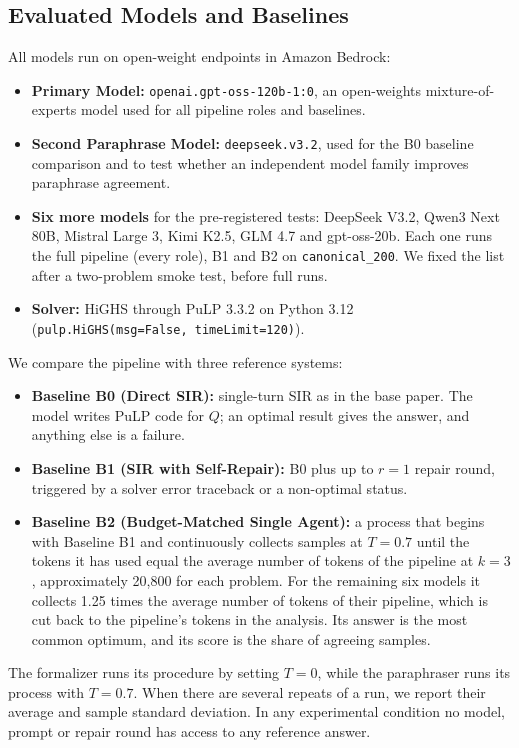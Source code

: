 \documentclass[conference]{IEEEtran}
\begin{document}
\subsection{Evaluated Models and Baselines}
All models run on open-weight endpoints in Amazon Bedrock:
\begin{itemize}
\item \textbf{Primary Model:} \texttt{openai.gpt-oss-120b-1:0}, an open-weights mixture-of-experts model used for all pipeline roles and baselines.
\item \textbf{Second Paraphrase Model:} \texttt{deepseek.v3.2}, used for the B0 baseline comparison and to test whether an independent model family improves paraphrase agreement.
\item \textbf{Six more models} for the pre-registered tests: DeepSeek V3.2, Qwen3 Next 80B, Mistral Large 3, Kimi
K2.5, GLM 4.7 and gpt-oss-20b. Each one runs the full pipeline (every role), B1 and B2 on \texttt{canonical\_200}.
We fixed the list after a two-problem smoke test, before full runs.
\item \textbf{Solver:} HiGHS through PuLP 3.3.2 on Python 3.12 (\texttt{pulp.HiGHS(msg=False, timeLimit=120)}).
\end{itemize}

We compare the pipeline with three reference systems:
\begin{itemize}
\item \textbf{Baseline B0 (Direct SIR):} single-turn SIR as in the base paper. The model writes PuLP code for $Q$; an optimal result gives the answer, and anything else is a failure.
\item \textbf{Baseline B1 (SIR with Self-Repair):} B0 plus up to $r = 1$ repair round, triggered by a solver error traceback or a non-optimal status.
\item \textbf{Baseline B2 (Budget-Matched Single Agent):} a process that begins with Baseline B1 and continuously collects samples at $T = 0.7$ until the tokens it has used equal the average number of tokens of the pipeline at $k = 3$, approximately 20,800 for each problem. For the remaining six models it collects 1.25 times the average number of tokens of their pipeline, which is cut back to the pipeline's tokens in the analysis. Its answer is the most common optimum, and its score is the share of agreeing samples.
\end{itemize}

The formalizer runs its procedure by setting $T = 0$, while the paraphraser runs its process with $T = 0.7$. When there
are several repeats of a run, we report their average and sample standard deviation. In any experimental condition no
model, prompt or repair round has access to any reference answer.
\end{document}
